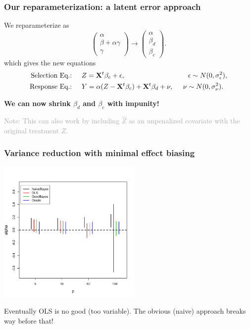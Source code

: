 \documentclass{beamer}
\newcommand{\X}{\mathbf{X}}
\newcommand{\bo}[1]{\textcolor{burntorange}{#1}}
\newcommand{\dg}[1]{\textcolor{darkgray}{#1}}
\begin{document}
\begin{frame}
\frametitle{Our reparameterization: a latent error approach}
\bo{We reparameterize as} 
\begin{equation*}
\begin{pmatrix}
\alpha\\
\beta +  \alpha \gamma\\
\gamma
\end{pmatrix} \rightarrow \begin{pmatrix}
\alpha \\
\beta_d\\
\beta_c
\end{pmatrix}.
\end{equation*}
which gives the new equations
\begin{equation*}
	\begin{split}
	\text{Selection Eq.:} &\hspace{5mm}	Z = \X^t\beta_c + \epsilon, \hspace{32.2mm} \epsilon \sim N(0,\sigma_{\epsilon}^{2}), 
		\\
		\text{Response Eq.:} &\hspace{5mm}	Y = \alpha(Z - \X^t\beta_c) + \X^t\beta_d + \nu, \hspace{5mm} \nu \sim N(0,\sigma_{\nu}^{2}).
	\end{split}
\end{equation*}
\begin{center}
\vspace{3mm}
{\bf We can now shrink $\beta_d$ and $\beta_c$  with impunity!}
\vspace{3mm}
\end{center}

{\small \dg{Note: This can also work by including $\hat{Z}$ as an unpenalized covariate with the original treatment $Z$.}}

\end{frame}


\begin{frame}
\frametitle{Variance reduction with minimal effect biasing}

\vspace{-8mm}
\begin{center}
\includegraphics[width=2.75in]{figures/DominiciSims1_plot2.pdf}
\end{center}
\vspace{-5mm}
Eventually OLS is no good (too variable). The obvious (naive) approach breaks way before that!
\vfill
\end{frame}
\end{document}
